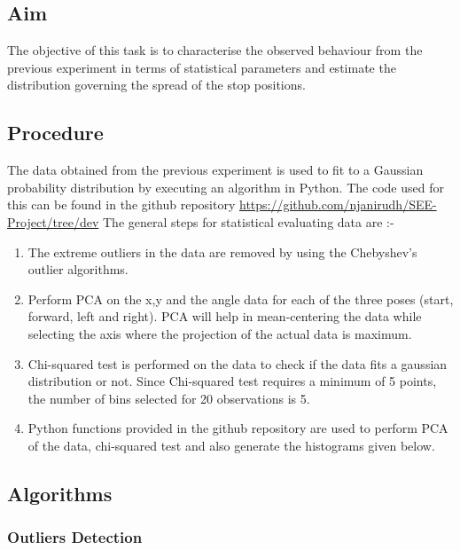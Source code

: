 \subsection{Aim}
\Large
The objective of this task is to characterise the observed behaviour from the previous experiment in terms of statistical parameters and estimate the distribution governing the spread of the stop positions.

\subsection{Procedure}

The data obtained from the previous experiment is used to fit to a Gaussian probability distribution by executing an algorithm in Python. The code used for this can be found in the github repository \href{https://github.com/njanirudh/SEE-Project/tree/dev}{https://github.com/njanirudh/SEE-Project/tree/dev}
The general steps for statistical evaluating data are :-
\begin{enumerate}
	\item The extreme outliers in the data are removed by using the Chebyshev's outlier algorithms. 
	\item Perform PCA on the x,y and the angle data for each of the three poses (start, forward, left and right). 
	PCA will help in mean-centering the data while selecting the axis where the projection of the actual data is maximum. 
	\item Chi-squared test is performed on the data to check if the data fits a gaussian distribution or not. 
	Since Chi-squared test requires a minimum of 5 points, the number of bins selected for 20 observations is 5.
	\item Python functions provided in the github repository are used to perform PCA of the data, chi-squared test and also generate the histograms given below.
	
\end{enumerate}


\newpage

{\color{blue}\subsection{Algorithms}}	
\subsubsection{Outliers Detection}

